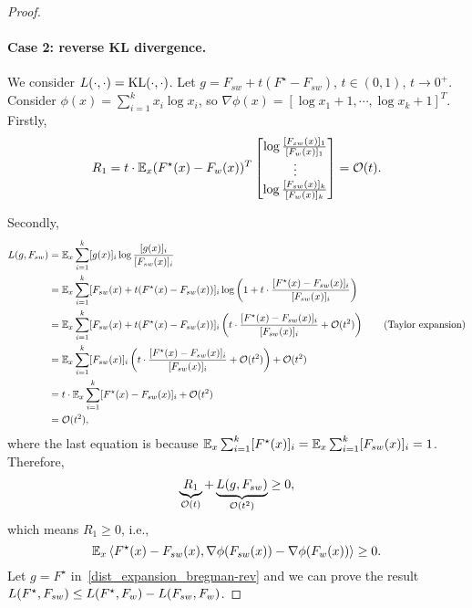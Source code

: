 \begin{proof}
\paragraph{Case 2: reverse KL divergence.}
We consider $L(\cdot, \cdot)=\mathrm{KL}(\cdot, \cdot)$.
Let $g=F_{sw} + t(F^\star-F_{sw})$, $t \in (0,1)$, $t \to 0^+$.
Consider $\phi(x)=\sum_{i=1}^k x_i \log x_i$, so $\nabla \phi(x)= [\log x_1+1, \cdots, \log x_k+1]^T$.
Firstly,
\begin{align*}
    R_1 = t \cdot \mathbb{E}_x (F^\star(x)-F_w(x))^T 
    \begin{bmatrix}
     \log \frac{[F_{sw}(x)]_1}{[F_w(x)]_1} \\
     \vdots \\
    \log \frac{[F_{sw}(x)]_k}{[F_w(x)]_k}
    \end{bmatrix} = \mathcal{O}(t).
\end{align*}

Secondly,
\begin{align*}
    L(g, F_{sw}) & = \mathbb{E}_x \sum_{i=1}^k [g(x)]_i \log \frac{[g(x)]_i}{[F_{sw}(x)]_i} 
    \\ & = \mathbb{E}_x \sum_{i=1}^k [F_{sw}(x) + t(F^\star(x)-F_{sw}(x))]_i \log \left( 1+ t \cdot \frac{[F^\star(x)-F_{sw}(x)]_i}{[F_{sw}(x)]_i} \right)
    \\ & = \mathbb{E}_x \sum_{i=1}^k [F_{sw}(x) + t(F^\star(x)-F_{sw}(x))]_i \left( t \cdot \frac{[F^\star(x)-F_{sw}(x)]_i}{[F_{sw}(x)]_i} + \mathcal{O}(t^2) \right) \tag{Taylor expansion}
    \\ & = \mathbb{E}_x \sum_{i=1}^k [F_{sw}(x)]_i \left( t \cdot \frac{[F^\star(x)-F_{sw}(x)]_i}{[F_{sw}(x)]_i} + \mathcal{O}(t^2) \right) + \mathcal{O}(t^2) 
    \\ & = t \cdot \mathbb{E}_x \sum_{i=1}^k [F^\star(x)-F_{sw}(x)]_i + \mathcal{O}(t^2) 
    \\ & = \mathcal{O}(t^2),
\end{align*}
where the last equation is because $\mathbb{E}_x \sum_{i=1}^k [F^\star(x)]_i = \mathbb{E}_x \sum_{i=1}^k [F_{sw}(x)]_i = 1$.
Therefore,
$$\underbrace{R_1}_{\mathcal{O}(t)} + \underbrace{L(g, F_{sw})}_{\mathcal{O}(t^2)} \ge 0,$$
which means $R_1 \ge 0$, i.e.,
$$\mathbb{E}_x \left \langle F^\star(x)-F_{sw}(x), \nabla \phi(F_{sw}(x)) - \nabla \phi(F_w(x)) \right \rangle \ge 0.$$
Let $g=F^\star$ in~\cref{dist_expansion_bregman-rev} and we can prove the result $L(F^\star, F_{sw}) \le L(F^\star, F_w) - L(F_{sw}, F_w)$.
\end{proof}



